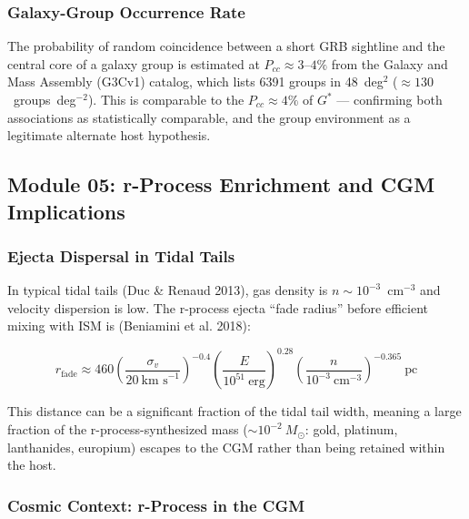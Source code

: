 \documentclass[11pt,letterpaper]{article}
\begin{document}
\subsubsection{Galaxy-Group Occurrence Rate}

The probability of random coincidence between a short GRB sightline and the central core of a galaxy group is estimated at $P_{cc} \approx 3$--$4\%$ from the Galaxy and Mass Assembly (G3Cv1) catalog, which lists 6391 groups in 48~deg$^2$ ($\approx 130$~groups~deg$^{-2}$). This is comparable to the $P_{cc} \approx 4\%$ of $G^*$ --- confirming both associations as statistically comparable, and the group environment as a legitimate alternate host hypothesis.

\subsection{Module 05: r-Process Enrichment and CGM Implications}

\subsubsection{Ejecta Dispersal in Tidal Tails}

In typical tidal tails (Duc \& Renaud 2013), gas density is $n \sim 10^{-3}$~cm$^{-3}$ and velocity dispersion is low. The r-process ejecta ``fade radius'' before efficient mixing with ISM is (Beniamini et al. 2018):

$$r_{\text{fade}} \approx 460 \left(\frac{\sigma_v}{20~\text{km~s}^{-1}}\right)^{-0.4} \left(\frac{E}{10^{51}~\text{erg}}\right)^{0.28} \left(\frac{n}{10^{-3}~\text{cm}^{-3}}\right)^{-0.365}~\text{pc}$$

This distance can be a significant fraction of the tidal tail width, meaning a large fraction of the r-process-synthesized mass ($\sim 10^{-2}~M_\odot$: gold, platinum, lanthanides, europium) escapes to the CGM rather than being retained within the host.

\subsubsection{Cosmic Context: r-Process in the CGM}
\end{document}

